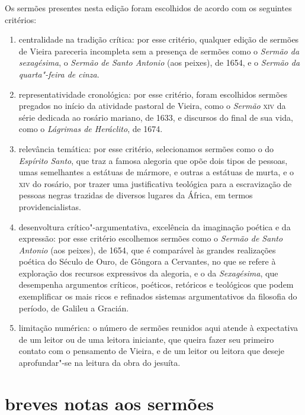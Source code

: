 
Os sermões presentes nesta edição foram escolhidos de acordo com os
seguintes critérios:

\begin{enumerate}
\item centralidade na tradição crítica: por esse critério, qualquer edição
de sermões de Vieira pareceria incompleta sem a presença de sermões como
o \emph{Sermão da sexagésima}, o \emph{Sermão de Santo Antonio} (aos
peixes), de 1654, e o \emph{Sermão da quarta"-feira de cinza}.

\item representatividade cronológica: por esse critério, foram escolhidos
sermões pregados no início da atividade pastoral de Vieira, como o
\emph{Sermão} \textsc{xiv} da série dedicada ao rosário mariano, de 1633, e
discursos do final de sua vida, como o \emph{Lágrimas de Heráclito}, de
1674.

\item relevância temática: por esse critério, selecionamos sermões como o
do \emph{Espírito Santo}, que traz a famosa alegoria que opõe dois tipos
de pessoas, umas semelhantes a estátuas de mármore, e outras a estátuas
de murta, e o \textsc{xiv} do rosário, por trazer uma justificativa teológica
para a escravização de pessoas negras trazidas de diversos lugares da
África, em termos providencialistas.

\item desenvoltura crítico"-argumentativa, excelência da imaginação poética
e da expressão: por esse critério escolhemos sermões como o \emph{Sermão
de Santo Antonio} (aos peixes), de 1654, que é comparável às grandes
realizações poética do Século de Ouro, de Gôngora a Cervantes, no que se
refere à exploração dos recursos expressivos da alegoria, e o da
\emph{Sexagésima}, que desempenha argumentos críticos, poéticos,
retóricos e teológicos que podem exemplificar os mais ricos e refinados
sistemas argumentativos da filosofia do período, de Galileu a Gracián.

\item limitação numérica: o número de sermões reunidos aqui atende à
expectativa de um leitor ou de uma leitora iniciante, que queira fazer
seu primeiro contato com o pensamento de Vieira, e de um leitor ou
leitora que deseje aprofundar"-se na leitura da obra do jesuíta.
\end{enumerate}

\section*{breves notas aos sermões}

